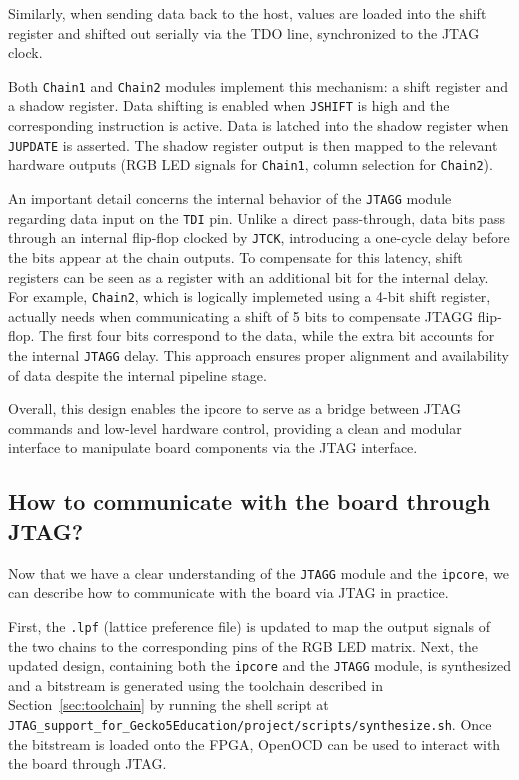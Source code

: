 \documentclass[a4paper,11pt,oneside]{report}
\begin{document}
Similarly, when sending data back to the host, values are loaded into the shift register and shifted out serially via the TDO line, synchronized to the JTAG clock.

Both \texttt{Chain1} and \texttt{Chain2} modules implement this mechanism: a shift register and a shadow register.  
Data shifting is enabled when \texttt{JSHIFT} is high and the corresponding instruction is active.  
Data is latched into the shadow register when \texttt{JUPDATE} is asserted.  
The shadow register output is then mapped to the relevant hardware outputs (RGB LED signals for \texttt{Chain1}, column selection for \texttt{Chain2}).

An important detail concerns the internal behavior of the \texttt{JTAGG} module regarding data input on the \texttt{TDI} pin.  
Unlike a direct pass-through, data bits pass through an internal flip-flop clocked by \texttt{JTCK}, introducing a one-cycle delay before the bits appear at the chain outputs.  
To compensate for this latency, shift registers can be seen as a register with an additional bit for the internal delay.  
For example, \texttt{Chain2}, which is logically implemeted using a 4-bit shift register, actually needs when communicating a shift of 5 bits to compensate JTAGG flip-flop.  
The first four bits correspond to the data, while the extra bit accounts for the internal \texttt{JTAGG} delay.  
This approach ensures proper alignment and availability of data despite the internal pipeline stage.

Overall, this design enables the ipcore to serve as a bridge between JTAG commands and low-level hardware control, providing a clean and modular interface to manipulate board components via the JTAG interface.

\subsection{How to communicate with the board through JTAG?} 
\label{sec:openocd}
Now that we have a clear understanding of the \texttt{JTAGG} module and the \texttt{ipcore}, we can describe how to communicate with the board via JTAG in practice.

First, the \texttt{.lpf} (lattice preference file) is updated to map the output signals of the two chains to the corresponding pins of the RGB LED matrix.  
Next, the updated design, containing both the \texttt{ipcore} and the \texttt{JTAGG} module, is synthesized and a bitstream is generated using the toolchain described in Section~\ref{sec:toolchain} by running the shell 
script at \texttt{JTAG\_support\_for\_Gecko5Education/project/scripts/synthesize.sh}.  
Once the bitstream is loaded onto the FPGA, OpenOCD can be used to interact with the board through JTAG.
\end{document}
